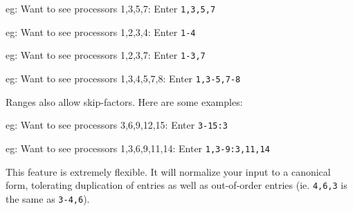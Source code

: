 \documentclass[10pt]{article}
\begin{document}
\begin{itemize}
\begin{itemize}
   eg: Want to see processors 1,3,5,7:  Enter {\tt 1,3,5,7}

   eg: Want to see processors 1,2,3,4:  Enter {\tt 1-4}

   eg: Want to see processors 1,2,3,7:  Enter {\tt 1-3,7}

   eg: Want to see processors 1,3,4,5,7,8: Enter {\tt 1,3-5,7-8}

Ranges also allow skip-factors. Here are some examples:

   eg: Want to see processors 3,6,9,12,15: Enter {\tt 3-15:3}

   eg: Want to see processors 1,3,6,9,11,14: Enter {\tt 1,3-9:3,11,14}

This feature is extremely flexible. It will normalize your input to a
canonical form, tolerating duplication of entries as well as
out-of-order entries (ie. {\tt 4,6,3} is the same as {\tt 3-4,6}).
\end{itemize}

\end{itemize}
\end{document}
